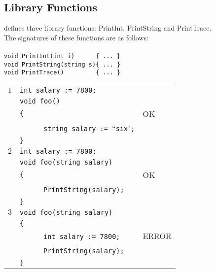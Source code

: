 \documentclass{article}
\begin{document}
\subsection{Library Functions}
\label{subsection_Library_Functions}
\plname defines three library functions: PrintInt, PrintString and PrintTrace.\\
The signatures of these functions are as follows:\\ \\
\verb"void PrintInt(int i)      { ... }"\\ 
\verb"void PrintString(string s){ ... }"\\ 
\verb"void PrintTrace()         { ... }"\\ 
\newpage
\begin{table}[h]
\centering
\begin{tabular}{|l|l|l|}
\hline
 $1$ & \verb"int salary := 7800;"                            &    \\
     & \verb"void foo()"                                     &    \\
     & \verb"{"                                              & OK \\
     & ~ ~ ~ ~\verb"string salary := "``\verb"six""\verb";"  &    \\
     & \verb"}"                                              &    \\
\hline
 $2$ & \verb"int salary := 7800;"         &    \\
     & \verb"void foo(string salary)"     &    \\
     & \verb"{"                           & OK \\
     & ~ ~ ~ ~\verb"PrintString(salary);" &    \\
     & \verb"}"                           &    \\
\hline
 $3$ & \verb"void foo(string salary)"     &       \\
     & \verb"{"                           &       \\
     & ~ ~ ~ ~\verb"int salary := 7800;"  & ERROR \\
     & ~ ~ ~ ~\verb"PrintString(salary);" &       \\
     & \verb"}"                           &       \\

\end{tabular}
\end{table}
\end{document}
